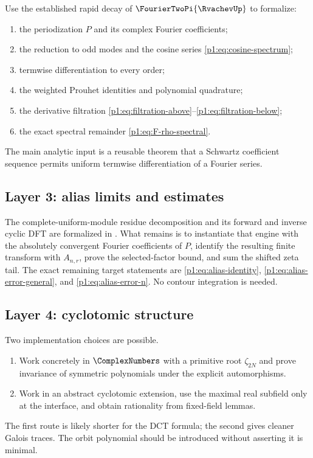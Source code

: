 \documentclass[11pt,oneside]{article}
\theoremstyle{definition}
\theoremstyle{remark}
\begin{document}
Use the established rapid decay of $\FourierTwoPi{\RvachevUp}$ to formalize:
\begin{enumerate}
 \item the periodization $P$ and its complex Fourier coefficients;
 \item the reduction to odd modes and the cosine series
 \eqref{p1:eq:cosine-spectrum};
 \item termwise differentiation to every order;
 \item the weighted Prouhet identities and polynomial quadrature;
 \item the derivative filtration \eqref{p1:eq:filtration-above}--\eqref{p1:eq:filtration-below};
 \item the exact spectral remainder \eqref{p1:eq:F-rho-spectral}.
\end{enumerate}
The main analytic input is a reusable theorem that a Schwartz coefficient
sequence permits uniform termwise differentiation of a Fourier series.

\subsection{Layer 3: alias limits and estimates}

The complete-uniform-module residue decomposition and its forward and inverse
cyclic DFT are formalized in .  What remains is
to instantiate that engine with the absolutely convergent Fourier
coefficients of \(P\), identify the resulting finite transform with
\(A_{n,r}\), prove the selected-factor bound, and sum the shifted zeta tail.
The exact remaining target statements are
\eqref{p1:eq:alias-identity}, \eqref{p1:eq:alias-error-general}, and
\eqref{p1:eq:alias-error-n}.  No contour integration is needed.

\subsection{Layer 4: cyclotomic structure}

Two implementation choices are possible.
\begin{enumerate}
 \item Work concretely in $\ComplexNumbers$ with a primitive root $\zeta_{2N}$ and prove
 invariance of symmetric polynomials under the explicit automorphisms.
 \item Work in an abstract cyclotomic extension, use the maximal real subfield
 only at the interface, and obtain rationality from fixed-field lemmas.
\end{enumerate}
The first route is likely shorter for the DCT formula; the second gives cleaner
Galois traces.  The orbit polynomial should be introduced without asserting it
is minimal.
\end{document}
